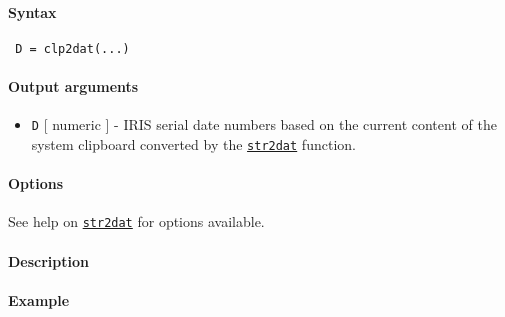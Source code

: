 


	\paragraph{Syntax}
 
 \begin{verbatim}
 D = clp2dat(...)
 \end{verbatim}
 
 \paragraph{Output arguments}
 
 \begin{itemize}
 \item
   \texttt{D} {[} numeric {]} - IRIS serial date numbers based on the
   current content of the system clipboard converted by the
   \href{dates/str2dat}{\texttt{str2dat}} function.
 \end{itemize}
 
 \paragraph{Options}
 
 See help on \href{dates/str2dat}{\texttt{str2dat}} for options
 available.
 
 \paragraph{Description}
 
 \paragraph{Example}


